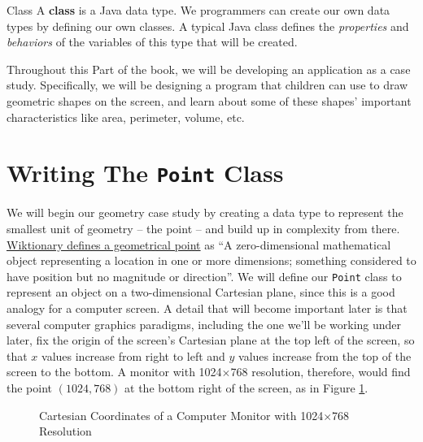 \begin{defn}{Class}
    A \textbf{class} is a Java data type.  We programmers can create our own data types by defining our own classes.  A typical Java class defines the \textit{properties} and \textit{behaviors} of the variables of this type that will be created.
\end{defn}

Throughout this Part of the book, we will be developing an application as a case study.  Specifically, we will be designing a program that children can use to draw geometric shapes on the screen, and learn about some of these shapes' important characteristics like area, perimeter, volume, etc.

\section{Writing The \texttt{Point} Class}

We will begin our geometry case study by creating a data type to represent the smallest unit of geometry -- the point -- and build up in complexity from there.  \href{https://en.wiktionary.org/wiki/point}{Wiktionary defines a geometrical point} as ``A zero-dimensional mathematical object representing a location in one or more dimensions; something considered to have position but no magnitude or direction''.  We will define our \texttt{Point} class to represent an object on a two-dimensional Cartesian plane, since this is a good analogy for a computer screen.  A detail that will become important later is that several computer graphics paradigms, including the one we'll be working under later, fix the origin of the screen's Cartesian plane at the top left of the screen, so that $x$ values increase from right to left and $y$ values increase from the top of the screen to the bottom.  A monitor with 1024$\times$768 resolution, therefore, would find the point $(1024,768)$ at the bottom right of the screen, as in Figure \ref{fig:monitor}.

\begin{figure}[ht]
    \color{nccblue}
    \begin{center}
    \end{center}
    \caption{Cartesian Coordinates of a Computer Monitor with 1024$\times$768 Resolution}
    \label{fig:monitor}
\end{figure}

